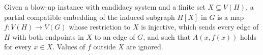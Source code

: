\begin{definition}
Given a blow-up instance with candidacy system  and a finite set $X\subseteq V(H)$, a partial compatible embedding of the induced subgraph $H[X]$ in $G$ is a map $f:V(H)\to V(G)$ whose restriction to $X$ is injective, which sends every edge of $H$ with both endpoints in $X$ to an edge of $G$, and such that $A(x,f(x))$ holds for every $x\in X$.  Values of $f$ outside $X$ are ignored.
\end{definition}

